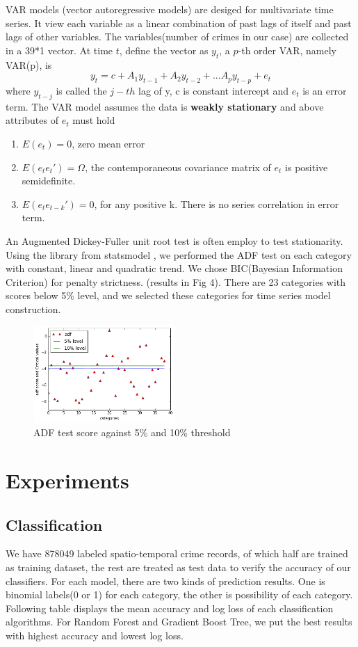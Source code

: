\documentclass[11pt,conference]{IEEEtran}
\begin{document}
VAR models (vector autoregressive models) are desiged for multivariate time series. It view each variable as a linear combination of past lags of itself and past lags of other variables. The variables(number of crimes in our case) are collected in a 39*1 vector. At time $t$, define the vector as $y_t$, a  $p$-th order VAR, namely VAR(p), is $$y_t = c + A_1y_{t-1} + A_2y_{t-2} + ... A_py_{t-p} + e_t$$ where $y_{t-j}$ is called the $j-th$ lag of y, c is constant intercept and $e_t$ is an error term. The VAR model assumes the data is \textbf{weakly stationary} and above attributes of $e_t$ must hold
\begin{enumerate}
	\item $E(e_t) = 0$, zero mean error
	\item $E(e_t{e_t}') = \Omega$, the contemporaneous covariance matrix of $e_t$ is positive semidefinite.
	\item $E(e_t{e_{t-k}}') = 0$, for any positive k. There is no series correlation in error term.
\end{enumerate}
An Augmented Dickey-Fuller unit root test \cite{4} is often employ to test stationarity.  Using the library from statsmodel \cite{5} , we performed the ADF test on each category with constant, linear and quadratic trend.  We chose BIC(Bayesian Information Criterion) for penalty strictness. (results in Fig 4). There are 23 categories with scores below 5\% level, and we selected these categories for time series model construction.

\begin{figure}[H]
\begin{center}
\includegraphics [width=0.48\textwidth]{pics/adf_test.png}
\caption{ADF test score against 5\% and 10\% threshold }
\end{center}
\end{figure}

\section{Experiments}
\subsection{Classification}
We have 878049 labeled spatio-temporal crime records, of which half are trained as training dataset, the rest are treated as test data to verify the accuracy of our classifiers. For each model, there are two kinds of prediction results. One is binomial labels(0 or 1) for each category, the other is possibility of each category. 
Following table displays the mean accuracy and log loss of each classification algorithms. For Random Forest and Gradient Boost Tree, we put the best results with highest accuracy and lowest log loss. 
\end{document}
